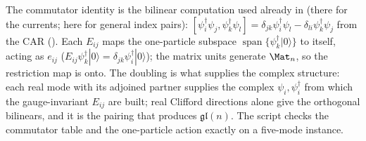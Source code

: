 The commutator identity is the bilinear computation used already in \cite[Prop.~6.1]{ButlerT7} (there for the currents; here for general index pairs): $[\psi_i^\dagger\psi_j, \psi_k^\dagger\psi_l] = \delta_{jk}\psi_i^\dagger\psi_l - \delta_{li}\psi_k^\dagger\psi_j$ from the CAR (). Each $E_{ij}$ maps the one-particle subspace $\operatorname{span}\{\psi_k^\dagger|0\rangle\}$ to itself, acting as $e_{ij}$ ($E_{ij}\psi_k^\dagger|0\rangle = \delta_{jk}\psi_i^\dagger|0\rangle$); the matrix units generate $\Mat_n$, so the restriction map is onto. The doubling is what supplies the complex structure: each real mode with its adjoined partner supplies the complex $\psi_i, \psi_i^\dagger$ from which the gauge-invariant $E_{ij}$ are built; real Clifford directions alone give the orthogonal bilinears, and it is the pairing that produces $\mathfrak{gl}(n)$. The script checks the commutator table and the one-particle action exactly on a five-mode instance.
